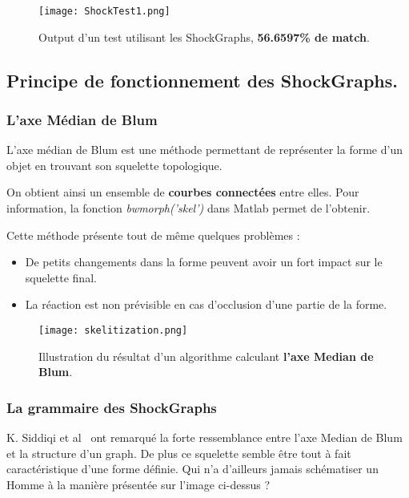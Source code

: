 \begin{figure}[H]
    \centering
    \texttt{[image: ShockTest1.png]}
	\caption{Output d'un test utilisant les ShockGraphs, \textbf{56.6597\% de match}.}\label{image.ShockTest1} 
\end{figure}


\clearpage

\subsection{Principe de fonctionnement des ShockGraphs.}

\subsubsection{L'axe Médian de Blum}

L'axe médian de Blum est une méthode permettant de représenter la forme d'un objet en trouvant son squelette topologique.

On obtient ainsi un ensemble de \textbf{courbes connectées} entre elles. Pour information, la fonction \textit{bwmorph('skel')} dans Matlab permet de l'obtenir.

Cette méthode présente tout de même quelques problèmes :
\begin{itemize}
	\item De petits changements dans la forme peuvent avoir un fort impact sur le squelette final.
	\item La réaction est non prévisible en cas d'occlusion d'une partie de la forme.
\end{itemize}
\vspace{8mm}
\begin{figure}[H]
    \centering
    \texttt{[image: skelitization.png]}
	\caption{Illustration du résultat d'un algorithme calculant \textbf{l'axe Median de Blum}.}\label{image.skel} 
\end{figure}

\subsubsection{La grammaire des ShockGraphs}


K. Siddiqi et al~\cite{Siddiqi1999} ont remarqué la forte ressemblance entre l'axe Median de Blum et la structure d'un graph. De plus ce squelette semble être tout à fait caractéristique d'une forme définie. Qui n'a d'ailleurs jamais schématiser un Homme à la manière présentée sur l'image ci-dessus ? 

